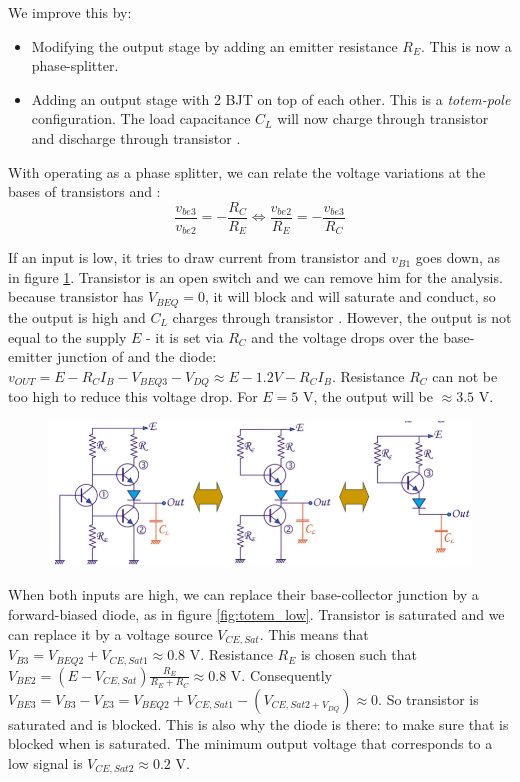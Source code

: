 We improve this by:
\begin{itemize}
	\item Modifying the output stage by adding an emitter resistance $R_E$. This is now a phase-splitter.
	\item Adding an output stage with 2 BJT on top of each other. This is a \emph{totem-pole} configuration. The load capacitance $C_L$ will now charge through transistor  and discharge through transistor .
\end{itemize}
With  operating as a phase splitter, we can relate the voltage variations at the bases of transistors  and :
$$
\frac{v_{be3}}{v_{be2}} = -\frac{R_C}{R_E} \Leftrightarrow \frac{v_{be2}}{R_E} = -\frac{v_{be3}}{R_C}
$$

If an input is low, it tries to draw current from transistor  and $v_{B1}$ goes down, as in figure \ref{fig:totem_high}. Transistor  is an open switch and we can remove him for the analysis. because transistor  has $V_{BEQ} = 0$, it will block and  will saturate and conduct, so the output is high and $C_L$ charges through transistor . However, the output is not equal to the supply $E$ - it is set via $R_C$ and the voltage drops over the base-emitter junction of  and the diode: $v_{OUT} = E - R_C I_B - V_{BEQ3} - V_{DQ} \approx E - 1.2V -R_C I_B$. Resistance $R_C$ can not be too high to reduce this voltage drop. For $E = 5$ V, the output will be $\approx 3.5$ V.

\begin{figure}[h!]
	\centering
	\includegraphics[width=16cm]{figures/ch15/totem_high.jpg}
	\caption{}
	\label{fig:totem_high}
\end{figure}

When both inputs are high, we can replace their base-collector junction by a forward-biased diode, as in figure \ref{fig:totem_low}. Transistor  is saturated and we can replace it by a voltage source $V_{CE,Sat}$. This means that $V_{B3} = V_{BEQ2} + V_{CE,Sat1} \approx 0.8$ V. Resistance $R_E$ is chosen such that $V_{BE2} = (E - V_{CE,Sat}) \frac{R_E}{R_E + R_C} \approx 0.8$ V. Consequently $V_{BE3} = V_{B3} - V_{E3} = V_{BEQ2} + V_{CE,Sat1} - (V_{CE,Sat2+V_{DQ}}) \approx 0$. So transistor  is saturated and  is blocked. This is also why the diode is there: to make sure that  is blocked when  is saturated. The minimum output voltage that corresponds to a low signal is $V_{CE,Sat2} \approx 0.2$ V.

